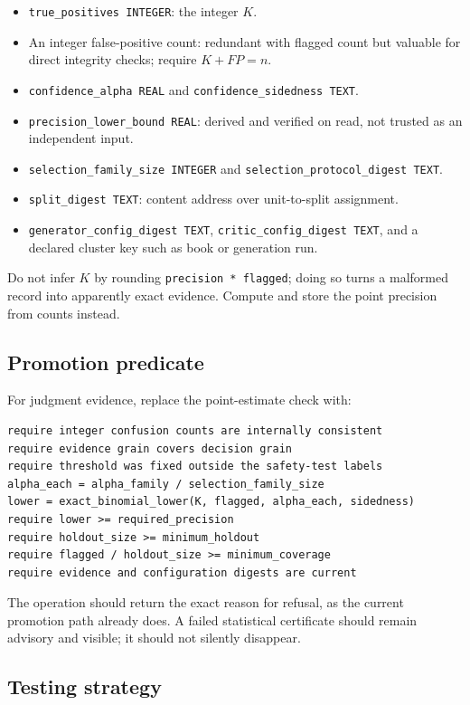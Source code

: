 \documentclass[11pt]{article}
\newcommand{\code}[1]{\texttt{#1}}
\begin{document}
\begin{itemize}
  \item \code{true\_positives INTEGER}: the integer $K$.
  \item An integer false-positive count: redundant with flagged count but valuable for
  direct integrity checks; require $K+FP=n$.
  \item \code{confidence\_alpha REAL} and \code{confidence\_sidedness TEXT}.
  \item \code{precision\_lower\_bound REAL}: derived and verified on read, not trusted as an
  independent input.
  \item \code{selection\_family\_size INTEGER} and \code{selection\_protocol\_digest TEXT}.
  \item \code{split\_digest TEXT}: content address over unit-to-split assignment.
  \item \code{generator\_config\_digest TEXT}, \code{critic\_config\_digest TEXT}, and a
  declared cluster key such as book or generation run.
\end{itemize}

Do not infer $K$ by rounding \code{precision * flagged}; doing so turns a malformed record
into apparently exact evidence. Compute and store the point precision from counts instead.

\subsection{Promotion predicate}

For judgment evidence, replace the point-estimate check with:

\begin{verbatim}
require integer confusion counts are internally consistent
require evidence grain covers decision grain
require threshold was fixed outside the safety-test labels
alpha_each = alpha_family / selection_family_size
lower = exact_binomial_lower(K, flagged, alpha_each, sidedness)
require lower >= required_precision
require holdout_size >= minimum_holdout
require flagged / holdout_size >= minimum_coverage
require evidence and configuration digests are current
\end{verbatim}

The operation should return the exact reason for refusal, as the current promotion path
already does. A failed statistical certificate should remain advisory and visible; it should
not silently disappear.

\subsection{Testing strategy}
\end{document}
